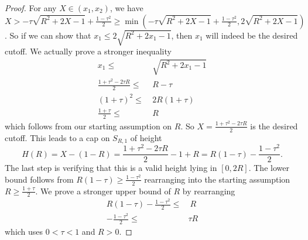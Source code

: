 {\begin{proof}
    For any $X \in (x_1, x_2)$, we have $X > -\tau\sqrt{R^2+2X-1} + \frac{1-\tau^2}{2} \geq \min(-\tau\sqrt{R^2+2X-1} + \frac{1-\tau^2}{2}, 2\sqrt{R^2+2X-1})$. So if we can show that $x_1 \leq 2\sqrt{R^2+2x_{1}-1}$, then $x_1$ will indeed be the desired cutoff. We actually prove a stronger inequality
    \begin{align*}
        x_1 \leq&\ \sqrt{R^2+2x_{1}-1} \\
        \frac{1+\tau^2 - 2\tau R}{2} \leq&\ R - \tau \\
        (1+\tau)^2 \leq&\ 2R(1 + \tau) \\
        \frac{1+\tau}{2} \leq&\ R
    \end{align*}
    which follows from our starting assumption on $R$. So $X = \frac{1+\tau^2 -2\tau R}{2}$ is the desired cutoff. This leads to a cap on $S_{R,1}$ of height
    \begin{equation*}
        H(R) = X-(1-R) = \frac{1+\tau^2 -2\tau R}{2} - 1 + R = R(1-\tau) - \frac{1-\tau^2}{2}.
    \end{equation*}
    The last step is verifying that this is a valid height lying in $[0,2R]$. The lower bound follows from $R(1-\tau) \geq \frac{1-\tau^2}{2}$ rearranging into the starting assumption $R \geq \frac{1+\tau}{2}$. We prove a stronger upper bound of $R$ by rearranging
    \begin{align*}
        R(1-\tau) - \frac{1-\tau^2}{2} \leq&\ R \\
        -\frac{1-\tau^2}{2} \leq& \tau R
    \end{align*}
    which uses $0 < \tau <1$ and $R > 0$.
\end{proof}}

